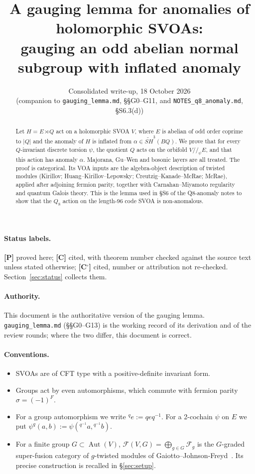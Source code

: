 \documentclass[11pt]{article}
\title{A gauging lemma for anomalies of holomorphic SVOAs:\\
gauging an odd abelian normal subgroup with inflated anomaly}
\author{Consolidated write-up, 18 October 2026\\
\small (companion to \texttt{gauging\_lemma.md}, \S\S G0--G11, and \texttt{NOTES\_q8\_anomaly.md}, \S S6.3(d))}
\date{}
\theoremstyle{definition}
\newcommand{\cF}{\mathcal F}
\newcommand{\Aut}{\operatorname{Aut}}
\newcommand{\SH}{\widetilde{SH}}
\newcommand{\st}[1]{\textbf{[#1]}}
\begin{document}
\maketitle

\begin{abstract}
Let $H=E\rtimes Q$ act on a holomorphic SVOA $V$, where $E$ is abelian of odd order coprime to
$|Q|$ and the anomaly of $H$ is inflated from $\alpha\in\SH^3(BQ)$. We prove that for every
$Q$-invariant discrete torsion $\psi$, the quotient $Q$ acts on the orbifold $V/\!/_\psi E$, and
that this action has anomaly $\alpha$. Majorana, Gu--Wen and bosonic layers are all treated. The proof is
categorical. Its VOA inputs are the algebra-object description of twisted modules (Kirillov;
Huang--Kirillov--Lepowsky; Creutzig--Kanade--McRae; McRae), applied after adjoining fermion parity,
together with Carnahan--Miyamoto regularity and quantum Galois theory. This is the lemma used in
\S S6 of the Q8-anomaly notes to show that the $Q_8$ action on the length-96 code SVOA is non-anomalous.
\end{abstract}

\paragraph{Status labels.} \st{P} proved here; \st{C} cited, with theorem number checked against
the source text unless stated otherwise; \st{C$^\circ$} cited, number or attribution not
re-checked. Section~\ref{sec:status} collects them.

\paragraph{Authority.} This document is the authoritative version of the gauging lemma.
\texttt{gauging\_lemma.md} (\S\S G0--G13) is the working record of its derivation and of the review
rounds; where the two differ, this document is correct.

\paragraph{Conventions.}
\begin{itemize}[nosep]
\item SVOAs are of CFT type with a positive-definite invariant form.
\item Groups act by even automorphisms, which commute with fermion parity $\sigma=(-1)^F$.
\item For a group automorphism we write ${}^q e:=qeq^{-1}$. For a 2-cochain $\psi$ on $E$ we put
$\psi^q(a,b):=\psi({}^{q^{-1}}a,{}^{q^{-1}}b)$.
\item For a finite group $G\subset\Aut(V)$, $\cF(V,G)=\bigoplus_{g\in G}\cF_g$ is the $G$-graded
super-fusion category of $g$-twisted modules of Gaiotto--Johnson-Freyd~\cite[Thm.~4.2]{GJF}. Its
precise construction is recalled in \S\ref{sec:setup}.
\end{itemize}
\end{document}
